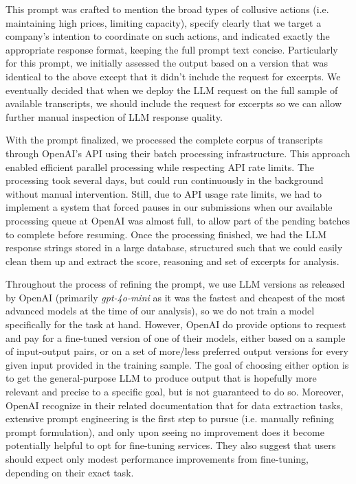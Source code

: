 This prompt was crafted to mention the broad types of collusive actions (i.e. maintaining high prices, limiting capacity), specify clearly that we target a company's intention to coordinate on such actions, and indicated exactly the appropriate response format, keeping the full prompt text concise. Particularly for this prompt, we initially assessed the output based on a version that was identical to the above except that it didn't include the request for excerpts. We eventually decided that when we deploy the LLM request on the full sample of available transcripts, we should include the request for excerpts so we can allow further manual inspection of LLM response quality.

With the prompt finalized, we processed the complete corpus of transcripts through OpenAI's API using their batch processing infrastructure. This approach enabled efficient parallel processing while respecting API rate limits. The processing took several days, but could run continuously in the background without manual intervention. Still, due to API usage rate limits, we had to implement a system that forced pauses in our submissions when our available processing queue at OpenAI was almost full, to allow part of the pending batches to complete before resuming. Once the processing finished, we had the LLM response strings stored in a large database, structured such that we could easily clean them up and extract the score, reasoning and set of excerpts for analysis.

Throughout the process of refining the prompt, we use LLM versions as released by OpenAI (primarily 
\textit{gpt-4o-mini} as it was the fastest and cheapest of the most advanced models at the time of our analysis), so we do not train a model specifically for the task at hand. However, OpenAI do provide options to request and pay for a fine-tuned version of one of their models, either based on a sample of input-output pairs, or on a set of more/less preferred output versions for every given input provided in the training sample. The goal of choosing either option is to get the general-purpose LLM to produce output that is hopefully more relevant and precise to a specific goal, but is not guaranteed to do so. Moreover, OpenAI recognize in their related documentation that for data extraction tasks, extensive prompt engineering is the first step to pursue (i.e. manually refining prompt formulation), and only upon seeing no improvement does it become potentially helpful to opt for fine-tuning services. They also suggest that users should expect only modest performance improvements from fine-tuning, depending on their exact task.
